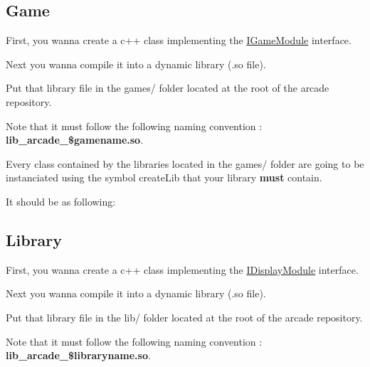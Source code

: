 \subsection*{Game}


\begin{DoxyItemize}
\item First, you wanna create a c++ class implementing the \mbox{\hyperlink{classArcade_1_1Games_1_1IGameModule}{I\+Game\+Module}} interface.
\item Next you wanna compile it into a dynamic library (.so file).
\item Put that library file in the {\ttfamily games/} folder located at the root of the arcade repository.
\begin{DoxyItemize}
\item Note that it must follow the following naming convention \+: {\bfseries{lib\+\_\+arcade\+\_\+\$gamename.\+so}}.
\end{DoxyItemize}
\end{DoxyItemize}

Every class contained by the libraries located in the {\ttfamily games/} folder are going to be instanciated using the symbol {\ttfamily create\+Lib} that your library {\bfseries{must}} contain.

It should be as following\+:


\begin{DoxyCode}{0}
\DoxyCodeLine{\{}
\DoxyCodeLine{\}}
\end{DoxyCode}


\subsection*{Library}


\begin{DoxyItemize}
\item First, you wanna create a c++ class implementing the \mbox{\hyperlink{classArcade_1_1Display_1_1IDisplayModule}{I\+Display\+Module}} interface.
\item Next you wanna compile it into a dynamic library (.so file).
\item Put that library file in the {\ttfamily lib/} folder located at the root of the arcade repository.
\begin{DoxyItemize}
\item Note that it must follow the following naming convention \+: {\bfseries{lib\+\_\+arcade\+\_\+\$libraryname.\+so}}.
\end{DoxyItemize}
\end{DoxyItemize}

